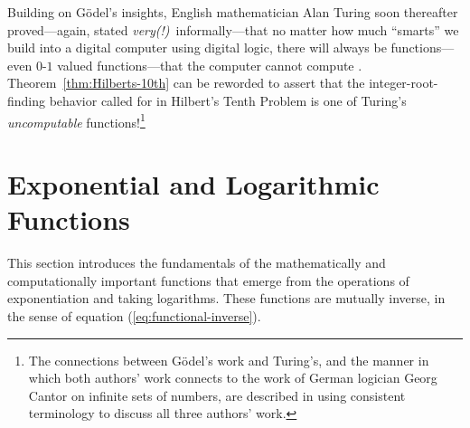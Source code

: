 \bigskip

\noindent {}

\bigskip

  

\noindent
Building on G\"{o}del's insights, English mathematician Alan Turing soon thereafter proved---again, stated {\em very(!)}~informally---that no matter how much ``smarts'' we build into a digital computer using digital logic, there will always be functions---even $0$-$1$ valued functions---that the computer cannot compute \cite{Turing36}.  Theorem~\ref{thm:Hilberts-10th} can be reworded to assert that the integer-root-finding behavior called for in Hilbert's Tenth Problem is one of Turing's {\it uncomputable} functions!\footnote{The connections between G\"{o}del's work and Turing's, and the manner in which both authors' work connects to the work of German logician Georg Cantor  on infinite sets of numbers, \cite{Cantor74,Cantor78} are described in \cite{Rosenberg09} using consistent terminology to discuss all three authors' work.}


\section{Exponential and Logarithmic Functions}
\label{sec:exponential+logarithm}

This section introduces the fundamentals of the mathematically and computationally important functions that emerge from the operations of exponentiation and taking logarithms.  These functions are mutually inverse, in the sense of equation (\ref{eq:functional-inverse}).

